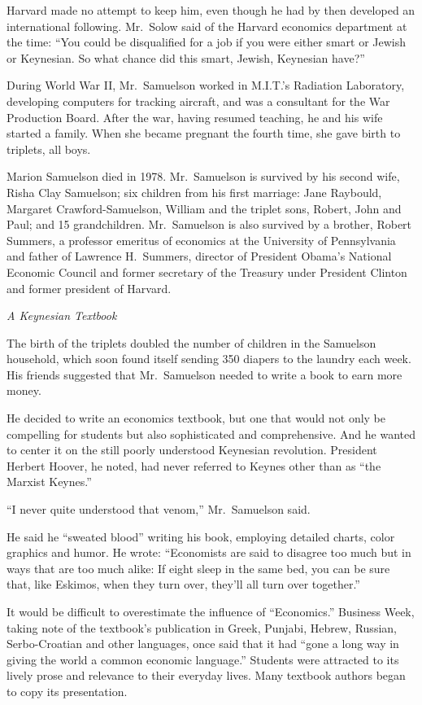 ﻿\documentclass[12pt]{article}
\begin{document}
Harvard made no attempt to keep him, even though he had by then developed an international
following. Mr.~Solow said of the Harvard economics department at the time: ``You could be
disqualified for a job if you were either smart or Jewish or Keynesian. So what chance did this
smart, Jewish, Keynesian have?''

During World War II, Mr.~Samuelson worked in M.I.T.'s Radiation Laboratory, developing computers for
tracking aircraft, and was a consultant for the War Production Board. After the war, having resumed
teaching, he and his wife started a family. When she became pregnant the fourth time, she gave birth
to triplets, all boys.

Marion Samuelson died in 1978. Mr.~Samuelson is survived by his second wife, Risha Clay Samuelson;
six children from his first marriage: Jane Raybould, Margaret Crawford-Samuelson, William and the
triplet sons, Robert, John and Paul; and 15 grandchildren. Mr.~Samuelson is also survived by a
brother, Robert Summers, a professor emeritus of economics at the University of Pennsylvania and
father of Lawrence H.~Summers, director of President Obama's National Economic Council and former
secretary of the Treasury under President Clinton and former president of Harvard.

\emph{A Keynesian Textbook}

The birth of the triplets doubled the number of children in the Samuelson household, which soon
found itself sending 350 diapers to the laundry each week. His friends suggested that Mr.~Samuelson
needed to write a book to earn more money.

He decided to write an economics textbook, but one that would not only be compelling for students
but also sophisticated and comprehensive. And he wanted to center it on the still poorly understood
Keynesian revolution. President Herbert Hoover, he noted, had never referred to Keynes other than as
``the Marxist Keynes.''

``I never quite understood that venom,'' Mr.~Samuelson said.

He said he ``sweated blood'' writing his book, employing detailed charts, color graphics and humor.
He wrote: ``Economists are said to disagree too much but in ways that are too much alike: If eight
sleep in the same bed, you can be sure that, like Eskimos, when they turn over, they'll all turn
over together.''

It would be difficult to overestimate the influence of ``Economics.'' Business Week, taking note of
the textbook's publication in Greek, Punjabi, Hebrew, Russian, Serbo-Croatian and other languages,
once said that it had ``gone a long way in giving the world a common economic language.'' Students
were attracted to its lively prose and relevance to their everyday lives. Many textbook authors
began to copy its presentation.
\end{document}
